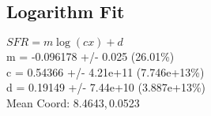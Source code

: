 \documentclass{article}
\begin{document}
		\subsection{Logarithm Fit}
		\begin{minipage}[h]{0.6\textwidth}
				\begin{center}
					\begingroup{}
		  			\resizebox{\textwidth}{!}{%
						
		  			}\endgroup
				\end{center}
		\end{minipage}
		\begin{minipage}[h]{0.35\textwidth}
			$SFR = m\log(c x) + d$ \\
			m               = -0.096178       +/- 0.025        (26.01\%) \\
			c               = 0.54366         +/- 4.21e+11    (7.746e+13\%) \\
			d               = 0.19149         +/- 7.44e+10    (3.887e+13\%) \\

			Mean Coord: 8.4643,\,0.0523
		\end{minipage}
\end{document}
